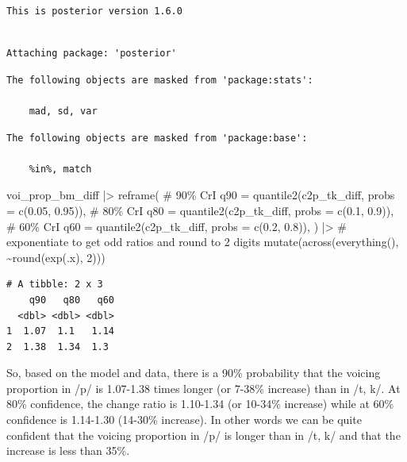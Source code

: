 \documentclass[
  authoryear,
  preprint,
  3p]{elsarticle}
\newenvironment{Shaded}{\begin{snugshade}}{\end{snugshade}}
\newcommand{\AttributeTok}[1]{\textcolor[rgb]{0.40,0.45,0.13}{#1}}
\newcommand{\CommentTok}[1]{\textcolor[rgb]{0.37,0.37,0.37}{#1}}
\newcommand{\DecValTok}[1]{\textcolor[rgb]{0.68,0.00,0.00}{#1}}
\newcommand{\FloatTok}[1]{\textcolor[rgb]{0.68,0.00,0.00}{#1}}
\newcommand{\FunctionTok}[1]{\textcolor[rgb]{0.28,0.35,0.67}{#1}}
\newcommand{\NormalTok}[1]{\textcolor[rgb]{0.00,0.23,0.31}{#1}}
\newcommand{\SpecialCharTok}[1]{\textcolor[rgb]{0.37,0.37,0.37}{#1}}
\begin{document}
\begin{verbatim}
This is posterior version 1.6.0
\end{verbatim}

\begin{verbatim}

Attaching package: 'posterior'
\end{verbatim}

\begin{verbatim}
The following objects are masked from 'package:stats':

    mad, sd, var
\end{verbatim}

\begin{verbatim}
The following objects are masked from 'package:base':

    %in%, match
\end{verbatim}

\begin{Shaded}
\begin{Highlighting}[]
\NormalTok{voi\_prop\_bm\_diff }\SpecialCharTok{|\textgreater{}} 
  \FunctionTok{reframe}\NormalTok{(}
    \CommentTok{\# 90\% CrI}
    \AttributeTok{q90 =} \FunctionTok{quantile2}\NormalTok{(c2p\_tk\_diff, }\AttributeTok{probs =} \FunctionTok{c}\NormalTok{(}\FloatTok{0.05}\NormalTok{, }\FloatTok{0.95}\NormalTok{)),}
    \CommentTok{\# 80\% CrI}
    \AttributeTok{q80 =} \FunctionTok{quantile2}\NormalTok{(c2p\_tk\_diff, }\AttributeTok{probs =} \FunctionTok{c}\NormalTok{(}\FloatTok{0.1}\NormalTok{, }\FloatTok{0.9}\NormalTok{)),}
    \CommentTok{\# 60\% CrI}
    \AttributeTok{q60 =} \FunctionTok{quantile2}\NormalTok{(c2p\_tk\_diff, }\AttributeTok{probs =} \FunctionTok{c}\NormalTok{(}\FloatTok{0.2}\NormalTok{, }\FloatTok{0.8}\NormalTok{)),}
\NormalTok{  ) }\SpecialCharTok{|\textgreater{}} 
  \CommentTok{\# exponentiate to get odd ratios and round to 2 digits}
  \FunctionTok{mutate}\NormalTok{(}\FunctionTok{across}\NormalTok{(}\FunctionTok{everything}\NormalTok{(), }\SpecialCharTok{\textasciitilde{}}\FunctionTok{round}\NormalTok{(}\FunctionTok{exp}\NormalTok{(.x), }\DecValTok{2}\NormalTok{)))}
\end{Highlighting}
\end{Shaded}

\begin{verbatim}
# A tibble: 2 x 3
    q90   q80   q60
  <dbl> <dbl> <dbl>
1  1.07  1.1   1.14
2  1.38  1.34  1.3 
\end{verbatim}

So, based on the model and data, there is a 90\% probability that the
voicing proportion in /p/ is 1.07-1.38 times longer (or 7-38\% increase)
than in /t, k/. At 80\% confidence, the change ratio is 1.10-1.34 (or
10-34\% increase) while at 60\% confidence is 1.14-1.30 (14-30\%
increase). In other words we can be quite confident that the voicing
proportion in /p/ is longer than in /t, k/ and that the increase is less
than 35\%.
\end{document}
